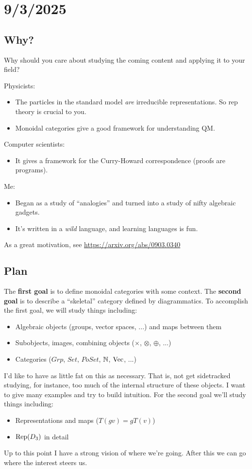 \section{9/3/2025}

\subsection{Why?}
Why should you care about studying the coming content and applying it to your field?

Physicists:
\begin{itemize}
    \item The particles in the standard model {\it are} irreducible representations. 
    So rep theory is crucial to you.
    \item Monoidal categories give a good framework for understanding QM.
\end{itemize}
Computer scientists:
\begin{itemize}
    \item It gives a framework for the Curry-Howard correspondence (proofs are programs).
\end{itemize}
Me:
\begin{itemize}
    \item Began as a study of ``analogies'' and turned into a study of nifty algebraic gadgets.
    \item It's written in a {\it wild} language, and learning languages is fun.
\end{itemize}
As a great motivation, see \url{https://arxiv.org/abs/0903.0340}


\subsection{Plan}
The {\bf first goal} is to define monoidal categories with some context. 
The {\bf second goal} is to describe a ``skeletal'' category defined by diagrammatics.
To accomplish the first goal, we will study things including:
\begin{itemize}
    \item Algebraic objects (groups, vector spaces, ...) and maps between them 
    \item Subobjects, images, combining objects ($\times$, $\otimes$, $\oplus$, ...) 
    \item Categories ($Grp$, $Set$, $PoSet$, $\mathbb{N}$, $\operatorname{Vec}$, ...)
\end{itemize}
I'd like to have as little fat on this as necessary.
That is, not get sidetracked studying, for instance, too much of the internal structure of these objects.
I want to give many examples and try to build intuition.
For the second goal we'll study things including:
\begin{itemize}
    \item Representations and maps ($T(gv) = gT(v)$)
    \item $\operatorname{Rep}(D_3)$ in detail
\end{itemize}
Up to this point I have a strong vision of where we're going. 
After this we can go where the interest steers us.


